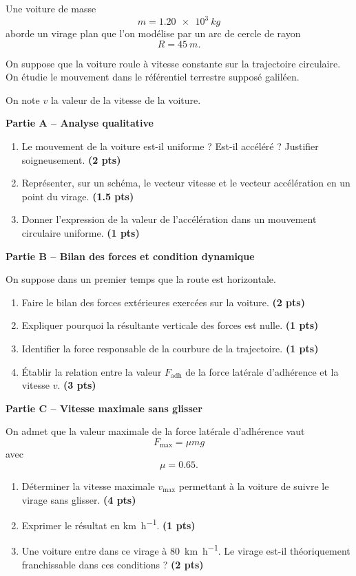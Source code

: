 \documentclass[11pt,a4paper]{article}
\newcommand{\bareme}[1]{\hfill{\color{blue!70!black}\textbf{(#1 pts)}}}
\begin{document}
Une voiture de masse
\[
m=\SI{1.20e3}{kg}
\]
aborde un virage plan que l’on modélise par un arc de cercle de rayon
\[
R=\SI{45}{m}.
\]

On suppose que la voiture roule à vitesse constante sur la trajectoire circulaire. On étudie le mouvement dans le référentiel terrestre supposé galiléen.

On note $v$ la valeur de la vitesse de la voiture.

\medskip

\textbf{Partie A -- Analyse qualitative}

\begin{enumerate}[label=\textbf{A.\arabic*.}, leftmargin=0.9cm]
    \item Le mouvement de la voiture est-il uniforme ? Est-il accéléré ? Justifier soigneusement. \bareme{2}
    \item Représenter, sur un schéma, le vecteur vitesse et le vecteur accélération en un point du virage. \bareme{1.5}
    \item Donner l’expression de la valeur de l’accélération dans un mouvement circulaire uniforme. \bareme{1}
\end{enumerate}

\medskip

\textbf{Partie B -- Bilan des forces et condition dynamique}

On suppose dans un premier temps que la route est horizontale.

\begin{enumerate}[label=\textbf{B.\arabic*.}, leftmargin=0.9cm]
    \item Faire le bilan des forces extérieures exercées sur la voiture. \bareme{2}
    \item Expliquer pourquoi la résultante verticale des forces est nulle. \bareme{1}
    \item Identifier la force responsable de la courbure de la trajectoire. \bareme{1}
    \item Établir la relation entre la valeur $F_{\text{adh}}$ de la force latérale d’adhérence et la vitesse $v$. \bareme{3}
\end{enumerate}

\medskip

\textbf{Partie C -- Vitesse maximale sans glisser}

On admet que la valeur maximale de la force latérale d’adhérence vaut
\[
F_{\max}=\mu m g
\]
avec
\[
\mu=0.65.
\]

\begin{enumerate}[label=\textbf{C.\arabic*.}, leftmargin=0.9cm]
    \item Déterminer la vitesse maximale $v_{\max}$ permettant à la voiture de suivre le virage sans glisser. \bareme{4}
    \item Exprimer le résultat en \si{km.h^{-1}}. \bareme{1}
    \item Une voiture entre dans ce virage à \SI{80}{km.h^{-1}}. Le virage est-il théoriquement franchissable dans ces conditions ? \bareme{2}
\end{enumerate}
\end{document}
